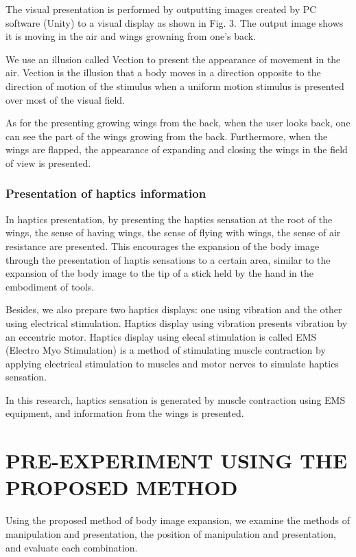 \documentclass[letterpaper, 10 pt, conference]{ieeeconf}  %
\begin{document}
                        The visual presentation is performed by outputting images created by PC software (Unity) to a visual display as shown in Fig. 3. 
                        The output image shows it is moving in the air and wings growning from one's back.

                        We use an illusion called Vection to present the appearance of movement in the air\cite{bhalla1999visual}.
                        Vection is the illusion that a body moves in a direction opposite to the direction of motion of the stimulus when a uniform motion stimulus is presented over most of the visual field.  
                        
                        As for the presenting growing wings from the back, when the user looks back, one can see the part of the wings growing from the back.
                        Furthermore, when the wings are flapped, the appearance of expanding and closing the wings in the field of view is presented.

                \subsubsection{Presentation of haptics information}
                        In haptics presentation, by presenting the haptics sensation at the root of the wings, the sense of having wings, the sense of flying with wings, the sense of air resistance are presented.  
                        This encourages the expansion of the body image through the presentation of haptis sensations to a certain area, similar to the expansion of the body image to the tip of a stick held by the hand in the embodiment of tools.

                        Besides, we also prepare two haptics displays: one using vibration and the other using electrical stimulation.
                        Haptics display using vibration presents vibration by an eccentric motor.  
                        Haptics display using elecal stimulation is called EMS (Electro Myo Stimulation) is a method of stimulating muscle contraction by applying electrical stimulation to muscles and motor nerves to simulate haptics sensation.  
                        
                        In this research, haptics sensation is generated by muscle contraction using EMS equipment, and information from the wings is presented.  


\section{PRE-EXPERIMENT USING THE PROPOSED METHOD}
        Using the proposed method of body image expansion, we examine the methods of manipulation and presentation, the position of manipulation and presentation, and evaluate each combination.  
\end{document}

